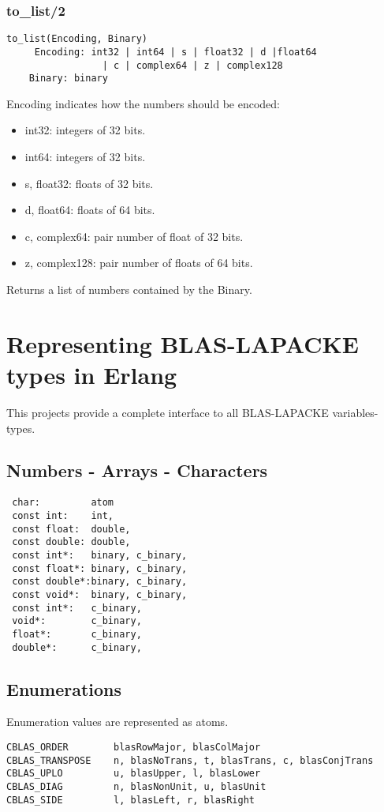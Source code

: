 \documentclass{article}
\begin{document}
    \subsubsection{to\_list/2}
        \begin{verbatim}
to_list(Encoding, Binary)
     Encoding: int32 | int64 | s | float32 | d |float64
                 | c | complex64 | z | complex128
    Binary: binary
        \end{verbatim}
        Encoding indicates how the numbers should be encoded:
        \begin{itemize}
            \item int32: integers of 32 bits.
            \item int64: integers of 32 bits.
            \item s, float32: floats of 32 bits.
            \item d, float64: floats of 64 bits.
            \item c, complex64: pair number of float of 32 bits.
            \item z, complex128: pair number of floats of 64 bits.
        \end{itemize}
        Returns a list of numbers contained by the Binary.

\section{Representing BLAS-LAPACKE types in Erlang}
This projects provide a complete interface to all BLAS-LAPACKE variables-types.

\subsection{Numbers - Arrays - Characters}
\begin{verbatim}
 char:         atom
 const int:    int,
 const float:  double,
 const double: double,
 const int*:   binary, c_binary,
 const float*: binary, c_binary,
 const double*:binary, c_binary,
 const void*:  binary, c_binary,
 const int*:   c_binary,
 void*:        c_binary,
 float*:       c_binary,
 double*:      c_binary,
\end{verbatim}

\subsection{Enumerations}
Enumeration values are represented as atoms.
\begin{verbatim}
CBLAS_ORDER        blasRowMajor, blasColMajor 
CBLAS_TRANSPOSE    n, blasNoTrans, t, blasTrans, c, blasConjTrans
CBLAS_UPLO         u, blasUpper, l, blasLower
CBLAS_DIAG         n, blasNonUnit, u, blasUnit
CBLAS_SIDE         l, blasLeft, r, blasRight
\end{verbatim}
\end{document}
